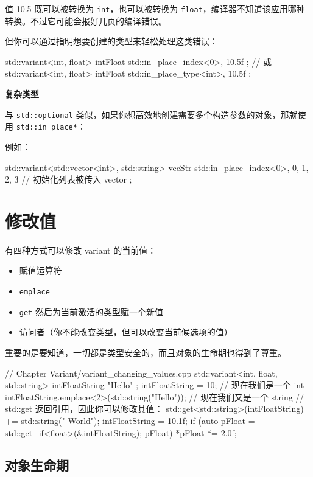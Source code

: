值 10.5 既可以被转换为 \texttt{int}，也可以被转换为 \texttt{float}，编译器不知道该应用哪种转换。不过它可能会报好几页的编译错误。

但你可以通过指明想要创建的类型来轻松处理这类错误：

\begin{codebox}[cpp]
std::variant<int, float> intFloat { std::in_place_index<0>, 10.5f };
// 或
std::variant<int, float> intFloat { std::in_place_type<int>, 10.5f };
\end{codebox}

\textbf{复杂类型}

与 \texttt{std::optional} 类似，如果你想高效地创建需要多个构造参数的对象，那就使用 \texttt{std::in\_place*}：

例如：

\begin{codebox}[cpp]
std::variant<std::vector<int>, std::string> vecStr {
std::in_place_index<0>, { 0, 1, 2, 3 } // 初始化列表被传入 vector
};
\end{codebox}

\section{修改值}

有四种方式可以修改 variant 的当前值：

\begin{itemize}
\item 赋值运算符
\item \texttt{emplace}
\item \texttt{get} 然后为当前激活的类型赋一个新值
\item 访问者（你不能改变类型，但可以改变当前候选项的值）
\end{itemize}

重要的是要知道，一切都是类型安全的，而且对象的生命期也得到了尊重。

\begin{codebox}[cpp]
// Chapter Variant/variant_changing_values.cpp
std::variant<int, float, std::string> intFloatString { "Hello" };
intFloatString = 10; // 现在我们是一个 int
intFloatString.emplace<2>(std::string("Hello")); // 现在我们又是一个 string
// std::get 返回引用，因此你可以修改其值：
std::get<std::string>(intFloatString) += std::string(" World");
intFloatString = 10.1f;
if (auto pFloat = std::get_if<float>(&intFloatString); pFloat)
*pFloat *= 2.0f;
\end{codebox}

\subsection{对象生命期}

